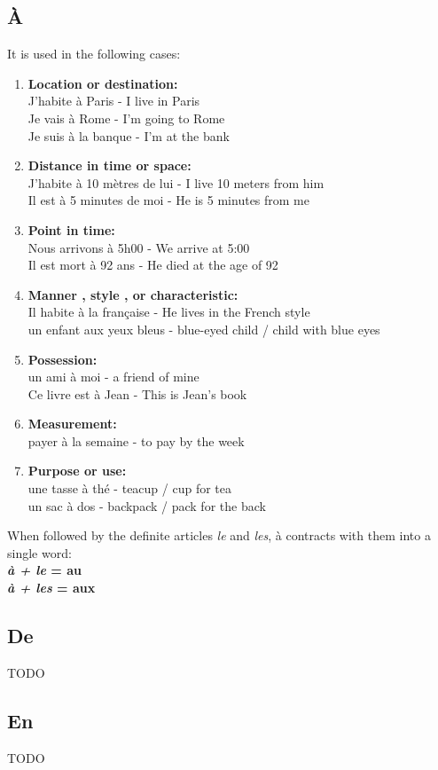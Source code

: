 \subsection{\`A}

It is used in the following cases:

\begin{enumerate}
\item{\textbf{Location or destination:}\\
J'habite \`{a} Paris - I live in Paris\\
Je vais \`{a} Rome - I'm going to Rome\\
Je suis \`{a} la banque - I'm at the bank}

\item{\textbf{Distance in time or space:}\\
J'habite \`{a} 10 m\`{e}tres de lui - I live 10 meters from him\\
Il est \`{a} 5 minutes de moi - He is 5 minutes from me}

\item{\textbf{Point in time:}\\
Nous arrivons \`{a} 5h00 - We arrive at 5:00\\
Il est mort \`{a} 92 ans - He died at the age of 92}

\item{\textbf{Manner , style , or characteristic:}\\
Il habite \`{a} la fran\c{c}aise - He lives in the French style\\
un enfant aux yeux bleus - blue-eyed child / child with blue eyes}

\item{\textbf{Possession:}\\
un ami \`{a} moi - a friend of mine\\
Ce livre est \`{a} Jean - This is Jean's book}

\item{\textbf{Measurement:}\\
payer \`{a} la semaine - to pay by the week}

\item{\textbf{Purpose or use:}\\
une tasse \`{a} th\'{e} - teacup / cup for tea\\
un sac \`{a} dos - backpack / pack for the back}
\end{enumerate}

\noindent When followed by the definite articles \emph{le}
and \emph{les}, \`a contracts with them into a single word:\\
\textbf{\emph{\`a + le} = au}   \\
\textbf{\emph{\`a + les} = aux} \\

\subsection{De}
TODO

\subsection{En}
TODO
